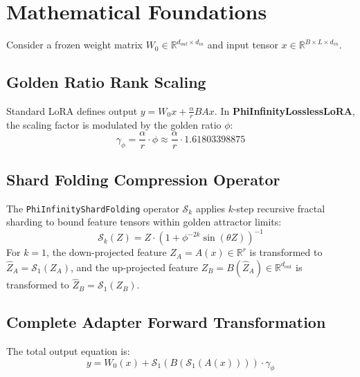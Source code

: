 \section{Mathematical Foundations}
Consider a frozen weight matrix $W_0 \in \mathbb{R}^{d_{out} \times d_{in}}$ and input tensor $x \in \mathbb{R}^{B \times L \times d_{in}}$.

\subsection{Golden Ratio Rank Scaling}
Standard LoRA defines output $y = W_0 x + \frac{\alpha}{r} B A x$. In \textbf{PhiInfinityLosslessLoRA}, the scaling factor is modulated by the golden ratio $\phi$:
\begin{equation}
    \gamma_{\phi} = \frac{\alpha}{r} \cdot \phi \approx \frac{\alpha}{r} \cdot 1.61803398875
\end{equation}

\subsection{Shard Folding Compression Operator}
The \texttt{PhiInfinityShardFolding} operator $\mathcal{S}_k$ applies $k$-step recursive fractal sharding to bound feature tensors within golden attractor limits:
\begin{equation}
    \mathcal{S}_k(Z) = Z \cdot \left(1 + \phi^{-2k} \sin(\theta Z)\right)^{-1}
\end{equation}
For $k=1$, the down-projected feature $Z_A = A(x) \in \mathbb{R}^{r}$ is transformed to $\hat{Z}_A = \mathcal{S}_1(Z_A)$, and the up-projected feature $Z_B = B(\hat{Z}_A) \in \mathbb{R}^{d_{out}}$ is transformed to $\hat{Z}_B = \mathcal{S}_1(Z_B)$.

\subsection{Complete Adapter Forward Transformation}
The total output equation is:
\begin{equation}
    y = W_0(x) + \mathcal{S}_1\left( B\left( \mathcal{S}_1( A(x) ) \right) \right) \cdot \gamma_{\phi}
\end{equation}